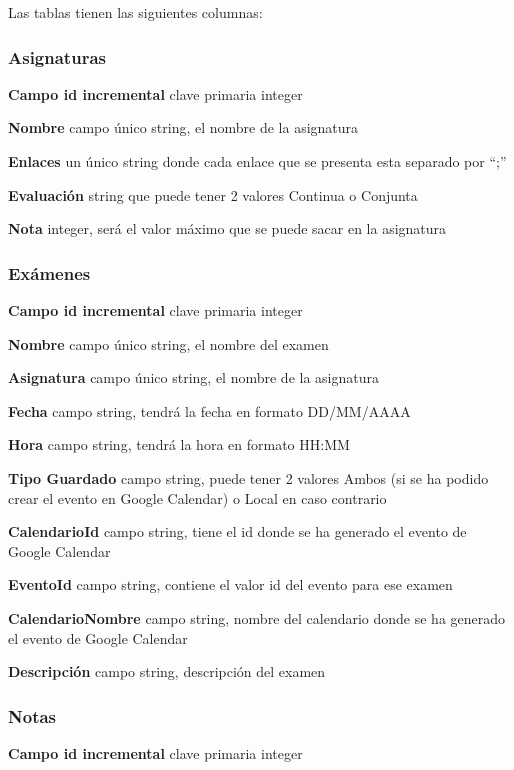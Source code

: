 Las tablas tienen las siguientes columnas:
\subsubsection{Asignaturas}
\label{subsubsecc:Asignaturas}


\textbf{Campo id incremental} clave primaria integer

\textbf{Nombre} campo único string, el nombre de la asignatura

\textbf{Enlaces}   un único string donde cada enlace que se presenta esta separado por “;”

\textbf{Evaluación} string que puede tener 2 valores Continua o Conjunta

\textbf{Nota} integer, será el valor máximo que se puede sacar en la asignatura

\subsubsection{Exámenes}
\label{subsubsecc:Exámenes}


\textbf{Campo id incremental} clave primaria integer

\textbf{Nombre} campo único string, el nombre del examen

\textbf{Asignatura} campo único string, el nombre de la asignatura

\textbf{Fecha} campo string, tendrá la fecha en formato DD/MM/AAAA

\textbf{Hora} campo string, tendrá la hora en formato HH:MM

\textbf{Tipo Guardado} campo string, puede tener 2 valores Ambos (si se ha podido crear el evento en Google Calendar) o Local  en caso contrario

\textbf{CalendarioId} campo string, tiene el id donde se ha generado el evento de Google Calendar

\textbf{EventoId} campo string, contiene el valor id del evento para ese examen

\textbf{CalendarioNombre} campo string, nombre del calendario donde se ha generado el evento de Google Calendar

\textbf{Descripción} campo string, descripción del examen

\subsubsection{Notas}
\label{subsubsecc:Notas}


\textbf{Campo id incremental} clave primaria integer

